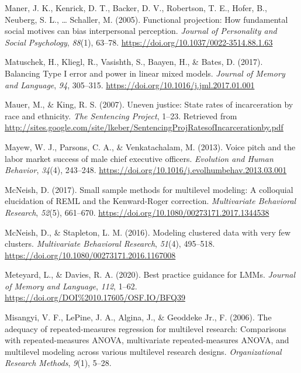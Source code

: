 \documentclass[
  english,
  man]{apa6}
\begin{document}
\leavevmode\hypertarget{ref-Maner2005}{}%
Maner, J. K., Kenrick, D. T., Backer, D. V., Robertson, T. E., Hofer, B., Neuberg, S. L., \ldots{} Schaller, M. (2005). Functional projection: How fundamental social motives can bias interpersonal perception. \emph{Journal of Personality and Social Psychology}, \emph{88}(1), 63--78. \url{https://doi.org/10.1037/0022-3514.88.1.63}

\leavevmode\hypertarget{ref-Matuschek2017}{}%
Matuschek, H., Kliegl, R., Vasishth, S., Baayen, H., \& Bates, D. (2017). Balancing Type I error and power in linear mixed models. \emph{Journal of Memory and Language}, \emph{94}, 305--315. \url{https://doi.org/10.1016/j.jml.2017.01.001}

\leavevmode\hypertarget{ref-Mauer2007}{}%
Mauer, M., \& King, R. S. (2007). Uneven justice: State rates of incarceration by race and ethnicity. \emph{The Sentencing Project}, 1--23. Retrieved from \url{http://sites.google.com/site/lkeber/SentencingProjRatesofIncarcerationby.pdf}

\leavevmode\hypertarget{ref-Mayew2013}{}%
Mayew, W. J., Parsons, C. A., \& Venkatachalam, M. (2013). Voice pitch and the labor market success of male chief executive officers. \emph{Evolution and Human Behavior}, \emph{34}(4), 243--248. \url{https://doi.org/10.1016/j.evolhumbehav.2013.03.001}

\leavevmode\hypertarget{ref-McNeish2017}{}%
McNeish, D. (2017). Small sample methods for multilevel modeling: A colloquial elucidation of REML and the Kenward-Roger correction. \emph{Multivariate Behavioral Research}, \emph{52}(5), 661--670. \url{https://doi.org/10.1080/00273171.2017.1344538}

\leavevmode\hypertarget{ref-Mcneish2016}{}%
McNeish, D., \& Stapleton, L. M. (2016). Modeling clustered data with very few clusters. \emph{Multivariate Behavioral Research}, \emph{51}(4), 495--518. \url{https://doi.org/10.1080/00273171.2016.1167008}

\leavevmode\hypertarget{ref-Meteyard2020}{}%
Meteyard, L., \& Davies, R. A. (2020). Best practice guidance for LMMs. \emph{Journal of Memory and Language}, \emph{112}, 1--62. \url{https://doi.org/DOI\%2010.17605/OSF.IO/BFQ39}

\leavevmode\hypertarget{ref-Misangyi2006}{}%
Misangyi, V. F., LePine, J. A., Algina, J., \& Geoddeke Jr., F. (2006). The adequacy of repeated-measures regression for multilevel research: Comparisons with repeated-measures ANOVA, multivariate repeated-measures ANOVA, and multilevel modeling across various multilevel research designs. \emph{Organizational Research Methods}, \emph{9}(1), 5--28.
\end{document}
